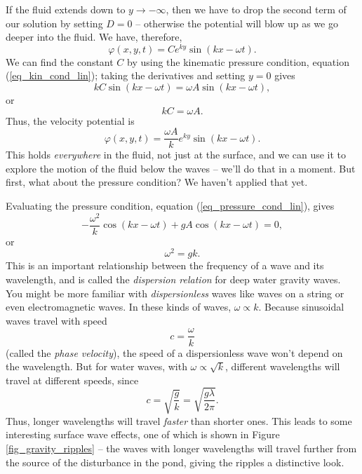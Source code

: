 If the fluid extends down to $y \to -\infty$, then we have to drop the second term of our solution by setting $D = 0$ -- otherwise the potential will blow up as we go deeper into the fluid.  We have, therefore, 
\[
\varphi(x, y, t) = C e^{ky} \sin (kx - \omega t).
\]
We can find the constant $C$ by using the kinematic pressure condition, equation (\ref{eq_kin_cond_lin}); taking the derivatives and setting $y = 0$ gives
\[
kC \sin(kx - \omega t) = \omega A \sin (kx - \omega t),
\]
or
\begin{equation}
kC = \omega A.
\end{equation}
Thus, the velocity potential is
\begin{equation}
\label{eq_sin_pot}
\varphi(x, y, t) = \frac{\omega A}{k} e^{ky} \sin (kx - \omega t).
\end{equation}
This holds \emph{everywhere} in the fluid, not just at the surface, and we can use it to explore the motion of the fluid below the waves -- we'll do that in a moment.  But first, what about the pressure condition?  We haven't applied that yet.

Evaluating the pressure condition, equation (\ref{eq_pressure_cond_lin}), gives
\[
-\frac{\omega^2}{k} \cos(kx - \omega t) + gA \cos(kx - \omega t) = 0,
\]
or
\begin{equation}
\label{eq_disp_relation}
\boxed{
\omega^2 = gk.
}
\end{equation}
This is an important relationship between the frequency of a wave and its wavelength, and is called the \emph{dispersion relation} for deep water gravity waves.  You might be more familiar with \emph{dispersionless} waves like waves on a string or even electromagnetic waves.  In these kinds of waves, $\omega \propto k$.  Because sinusoidal waves travel with speed
\begin{equation}
c = \frac{\omega}{k}
\end{equation}
(called the \emph{phase velocity}), the speed of a dispersionless wave won't depend on the wavelength.  But for water waves, with $\omega \propto \sqrt{k}$, different wavelengths will travel at different speeds, since
\[
c = \sqrt{\frac{g}{k}} = \sqrt{\frac{g\lambda}{2\pi}}.
\]
Thus, longer wavelengths will travel \emph{faster} than shorter ones.  This leads to some interesting surface wave effects, one of which is shown in Figure \ref{fig_gravity_ripples} -- the waves with longer wavelengths will travel further from the source of the disturbance in the pond, giving the ripples a distinctive look.

